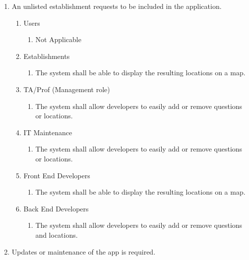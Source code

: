 \documentclass[titlepage]{article}
\begin{document}
\begin{enumerate}[{BE1}]
			
			\item An unlisted establishment requests to be included in the application.
			\begin{enumerate}[{VP2.1}]
				
				\item Users
				\begin{enumerate}
					\item Not Applicable 
				\end{enumerate}
				
				\item Establishments
				\begin{enumerate}
					\item The system shall be able to display the resulting locations on a map.
				\end{enumerate}
				
				\item TA/Prof (Management role)
				\begin{enumerate}
					\item The system shall allow developers to easily add or remove questions or locations.
				\end{enumerate}
				
				\item IT Maintenance
				\begin{enumerate}
					\item The system shall allow developers to easily add or remove questions or locations.
				\end{enumerate}
				
				\item Front End Developers
				\begin{enumerate}
					\item The system shall be able to display the resulting locations on a map.				\end{enumerate}
				
				\item Back End Developers
				\begin{enumerate}
					\item The system shall allow developers to easily add or remove questions and locations.
				\end{enumerate}
			\end{enumerate}
			
			\item Updates or maintenance of the app is required.
			\begin{enumerate}[{VP3.1}]
				

\end{enumerate}
\end{enumerate}
\end{document}
